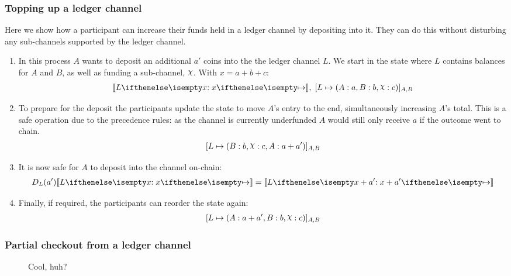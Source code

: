 \subsubsection{Topping up a ledger channel}

Here we show how a participant can increase their funds held in a ledger channel by depositing into it.
They can do this without disturbing any sub-channels supported by the ledger channel.
\begin{enumerate}
  \item In this process $A$ wants to deposit an additional $a'$ coins into the the ledger channel $L$. We start in the state where $L$ contains balances for $A$ and $B$, as well as funding a sub-channel, $\rchi$. With $x = a + b + c$:
  \begin{align}
    \adj{\holds{L}{x}{}}, \; \finalizable{L}{\alloc{A: a, B: b, \rchi: c}}{A, B}
  \end{align}
  \item To prepare for the deposit the participants update the state to move $A$'s entry to the end, simultaneously increasing $A$'s total. This is a safe operation due to the precedence rules: as the channel is currently underfunded $A$ would still only receive $a$ if the outcome went to chain.
  \begin{align}
    \finalizable{L}{\alloc{B:b, \rchi: c, A: a + a'}}{A,B}
  \end{align}
  \item It is now safe for $A$ to deposit into the channel on-chain:
  \begin{align}
    D_L(a')\adj{\holds{L}{x}{}} = \adj{\holds{L}{x + a'}{}}
  \end{align}
  \item Finally, if required, the participants can reorder the state again:
  \begin{align}
    \finalizable{L}{\alloc{ A: a + a', B: b, \rchi: c}}{A,B}
  \end{align}
\end{enumerate}


\subsubsection{Partial checkout from a ledger channel}

\begin{figure}[h]\centering
  \caption{Cool, huh?}
\end{figure}

